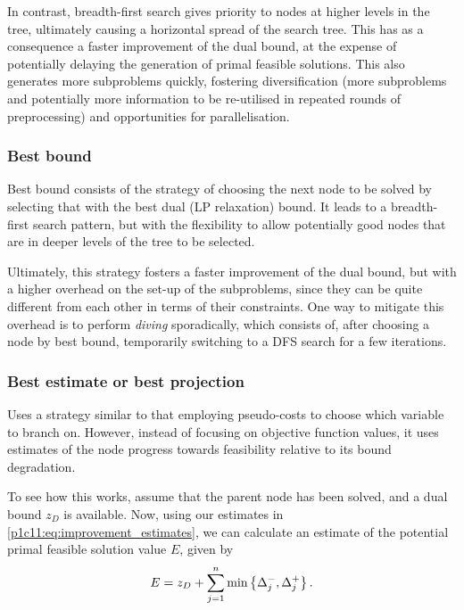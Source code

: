In contrast, breadth-first search gives priority to nodes at higher levels in the tree, ultimately causing a horizontal spread of the search tree. This has as a consequence a faster improvement of the dual bound, at the expense of potentially delaying the generation of primal feasible solutions. This also generates more subproblems quickly, fostering diversification (more subproblems and potentially more information to be re-utilised in repeated rounds of preprocessing) and opportunities for parallelisation. 


\subsubsection{Best bound}

Best bound consists of the strategy of choosing the next node to be solved by selecting that with the best dual (LP relaxation) bound. It leads to a breadth-first search pattern, but with the flexibility to allow potentially good nodes that are in deeper levels of the tree to be selected. 

Ultimately, this strategy fosters a faster improvement of the dual bound, but with a higher overhead on the set-up of the subproblems, since they can be quite different from each other in terms of their constraints. One way to mitigate this overhead is to perform \emph{diving} sporadically, which consists of, after choosing a node by best bound, temporarily switching to a DFS search for a few iterations.


\subsubsection{Best estimate or best projection}

Uses a strategy similar to that employing pseudo-costs to choose which variable to branch on. However, instead of focusing on objective function values, it uses estimates of the node progress towards feasibility relative to its bound degradation. 

To see how this works, assume that the parent node has been solved, and a dual bound $z_D$ is available. Now, using our estimates in \eqref{p1c11:eq:improvement_estimates}, we can calculate an estimate of the potential primal feasible solution value $E$, given by
%
\begin{equation*}
	E = z_D + \sum_{j = 1}^n \min\left\{ \Delta^-_j, \Delta^+_j \right \}.	
\end{equation*}
%

